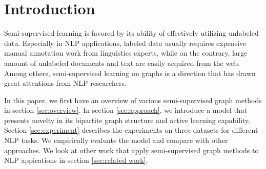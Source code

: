 \section{Introduction}

%

Semi-supervised learning is favored by its ability of effectively utilizing
unlabeled data. Especially in NLP applications, labeled data usually requires
expensive manual annotation work from linguistics experts, while on the
contrary, large amount of unlabeled documents and text are easily acquired from
the web. Among others,
semi-supervised learning on graphs is a direction that has drawn great
attentions from NLP researchers. %

In this paper, we first have an overview of various semi-supervised graph methods in section
\ref{sec:overview}. In section \ref{sec:approach}, we introduce a model that
presents novelty in its bipartite graph structure and active learning
capability. 
Section \ref{sec:experiment} describes the experiments on three datasets for
different NLP tasks. We empirically evaluate the model and compare with other
approaches. We look at other work that apply semi-supervised graph
methods to NLP appications in section \ref{sec:related work}.



%
